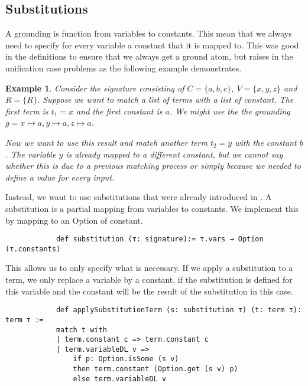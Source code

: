 \documentclass{article}
\newtheorem{example}{Example}
\begin{document}
        
        \subsection{Substitutions}
            A grounding is function from variables to constants. This mean that we always need to specify for every variable a constant that it is mapped to. This was good in the definitions to ensure that we always get a ground atom, but raises in the unification case problems as the following example demonstrates.

            \begin{example}
                Consider the signature consisting of $C = \{a,b,c\}$, $V = \{x,y,z \}$ and $R = \{R\}$. Suppose we want to match a list of terms with a list of constant. The first term is $t_1 = x$ and the first constant is $a$. We might use the the grounding $g = x \mapsto a, y \mapsto a, z \mapsto a$.

                Now we want to use this result and match another term $t_2 = y$ with the constant $b$. The variable $y$ is already mapped to a different constant, but we cannot say whether this is due to a previous matching process or simply because we needed to define a value for every input.
            \end{example}

            Instead, we want to use substitutions that were already introduced in \cite{datalogCoq}. A substitution is a partial mapping from variables to constants. We implement this by mapping to an Option of constant.

            \begin{lstlisting}
            def substitution (τ: signature):= τ.vars → Option (τ.constants)
            \end{lstlisting}

            This allows us to only specify what is necessary. If we apply a substitution to a term, we only replace a variable by a constant, if the substitution is defined for this variable and the constant will be the result of the substitution in this case.

            \begin{lstlisting}
            def applySubstitutionTerm (s: substitution τ) (t: term τ): term τ :=
            match t with
            | term.constant c => term.constant c
            | term.variableDL v => 
                if p: Option.isSome (s v) 
                then term.constant (Option.get (s v) p) 
                else term.variableDL v
            \end{lstlisting}
\end{document}
